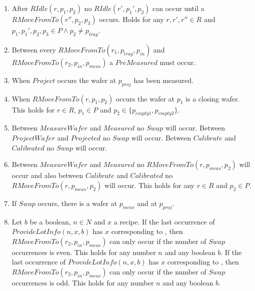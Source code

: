 \begin{enumerate}
    \item After $\mathit{RIdle}(r, p_1, p_2)$ no $\mathit{RIdle}(r', p_1', p_2)$ can occur until a $\mathit{RMoveFromTo}(r'',p_2,p_3)$ occurs.
    Holds for any $r,r',r''\in R$ and $p_1,p_1',p_2,p_3 \in P \wedge p_2 \neq p_\mathit{tray}$.

    \item Between every $\mathit{RMoveFromTo}(r_1, p_\mathit{tray},p_\mathit{in})$ and $\mathit{RMoveFromTo}(r_2, p_\mathit{in}, p_\mathit{meas})$ a $\mathit{PreMeasured}$ must occur.

    \item When $\mathit{Project}$ occurs the wafer at $p_\mathit{proj}$ has been measured.

    \item When $\mathit{RMoveFromTo}(r, p_1, p_2)$ occurs the wafer at $p_1$ is a closing wafer.
    This holds for $r \in R$, $p_1 \in P$ and $p_2 \in \{p_\textit{empty1}, p_\textit{empty2}\}$.
    
    \item Between $\mathit{MeasureWafer}$ and $\mathit{Measured}$ no $\mathit{Swap}$ will occur.
    Between $\mathit{ProjectWafer}$ and $\mathit{Projected}$ no $\mathit{Swap}$ will occur.
    Between $\mathit{Calibrate}$ and $\mathit{Calibrated}$ no $\mathit{Swap}$ will occur.

    \item Between $\mathit{MeasureWafer}$ and $\mathit{Measured}$ no $\mathit{RMoveFromTo}(r, p_\mathit{meas}, p_2)$ will occur and also between $\mathit{Calibrate}$ and $\mathit{Calibrated}$ no $\mathit{RMoveFromTo}(r, p_\mathit{meas}, p_2)$ will occur.
    This holds for any $r \in R$ and $p_2 \in P$.
    
    \item If $\mathit{Swap}$ occurs, there is a wafer at $p_\mathit{meas}$ and at $p_\mathit{proj}$.

    \item Let $b$ be a boolean, $n \in N$ and $x$ a recipe.
        If the last occurrence of $\mathit{ProvideLotInfo}(n, x, b)$ has $x$ corresponding to \recipeOne, then $\mathit{RMoveFromTo}(r_2,p_\mathit{in},p_\mathit{meas})$ can only occur if the number of $\mathit{Swap}$ occurrences is even.
        This holds for any number $n$ and any boolean $b$.
        If the last occurrence of $\mathit{ProvideLotInfo}(n, x, b)$ has $x$ corresponding to \recipeTwo, then $\mathit{RMoveFromTo}(r_2,p_\mathit{in},p_\mathit{meas})$ can only occur if the number of $\mathit{Swap}$ occurrences is odd.
        This holds for any number $n$ and any boolean $b$.


\end{enumerate}
